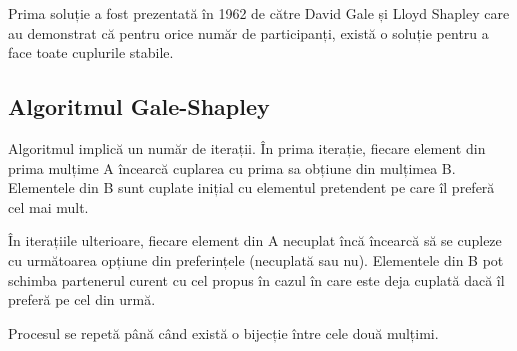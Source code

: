 Prima soluție a fost prezentată în 1962 de către David Gale și Lloyd Shapley care au demonstrat că pentru orice număr de participanți, există o soluție pentru a face toate cuplurile stabile.

\subsection{Algoritmul Gale-Shapley}
Algoritmul implică un număr de iterații. În prima iterație, fiecare element din prima mulțime A încearcă cuplarea cu prima sa obțiune din mulțimea B. Elementele din B sunt cuplate inițial cu elementul pretendent pe care îl preferă cel mai mult.

În iterațiile ulterioare, fiecare element din A necuplat încă încearcă să se cupleze cu următoarea opțiune din preferințele (necuplată sau nu). Elementele din B pot schimba partenerul curent cu cel propus în cazul în care este deja cuplată dacă îl preferă pe cel din urmă.

Procesul se repetă până când există o bijecție între cele două mulțimi.
 